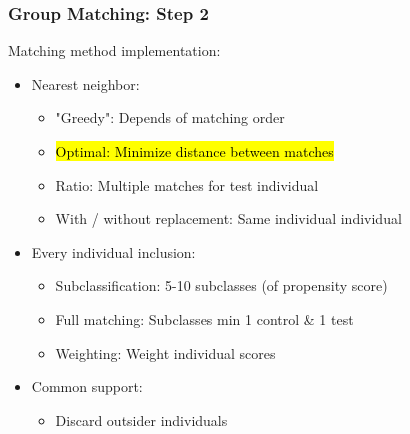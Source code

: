 \documentclass[xcolor=table]{beamer}
\makeatletter
\let\HL\hl
\renewcommand\hl{%
	\let\set@color\beamerorig@set@color
	\let\reset@color\beamerorig@reset@color
	\HL}
\makeatother
\begin{document}
\begin{frame}[noframenumbering]
	\frametitle{Group Matching: Step 2}
	Matching method implementation:
	\begin{itemize}[label=$\bullet$]
		\item Nearest neighbor:
		\begin{itemize}[label=$-$]
			\item "Greedy": Depends of matching order
			\item \hl{Optimal: Minimize distance between matches}
			\item Ratio: Multiple matches for test individual
			\item With / without replacement: Same individual individual
		\end{itemize}
		\item Every individual inclusion:
		\begin{itemize}[label=$-$]
			\item Subclassification: 5-10 subclasses (of propensity score)
			\item Full matching: Subclasses min 1 control \& 1 test
			\item Weighting: Weight individual scores
		\end{itemize}
		\item Common support:
		\begin{itemize}[label=$-$]
			\item Discard outsider individuals
		\end{itemize}
	\end{itemize}
\end{frame}

\end{document}
